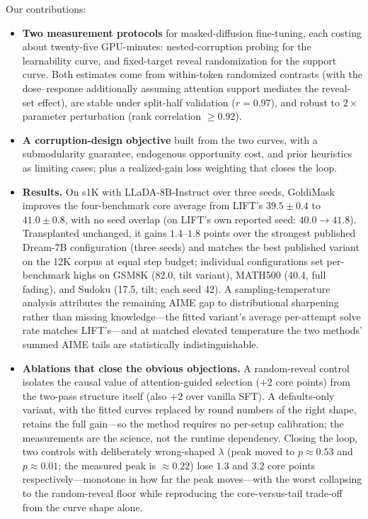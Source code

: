 \documentclass{article} %
\begin{document}
Our contributions:
\begin{itemize}
\item \textbf{Two measurement protocols} for masked-diffusion fine-tuning, each costing about twenty-five GPU-minutes: nested-corruption probing for the learnability curve, and fixed-target reveal randomization for the support curve. Both estimates come from within-token randomized contrasts (with the dose--response additionally assuming attention support mediates the reveal-set effect), are stable under split-half validation ($r = 0.97$), and robust to $2\times$ parameter perturbation (rank correlation $\geq 0.92$).
\item \textbf{A corruption-design objective} built from the two curves, with a submodularity guarantee, endogenous opportunity cost, and prior heuristics as limiting cases; plus a realized-gain loss weighting that closes the loop.
\item \textbf{Results.} On s1K with LLaDA-8B-Instruct over three seeds, GoldiMask improves the four-benchmark core average from LIFT's $39.5 \pm 0.4$ to $41.0 \pm 0.8$, with no seed overlap (on LIFT's own reported seed: $40.0 \to 41.8$). Transplanted unchanged, it gains $1.4$--$1.8$ points over the strongest published Dream-7B configuration (three seeds) and matches the best published variant on the 12K corpus at equal step budget; individual configurations set per-benchmark highs on GSM8K (82.0, tilt variant), MATH500 (40.4, full fading), and Sudoku (17.5, tilt; each seed 42). A sampling-temperature analysis attributes the remaining AIME gap to distributional sharpening rather than missing knowledge---the fitted variant's average per-attempt solve rate matches LIFT's---and at matched elevated temperature the two methods' summed AIME tails are statistically indistinguishable.
\item \textbf{Ablations that close the obvious objections.} A random-reveal control isolates the causal value of attention-guided selection ($+2$ core points) from the two-pass structure itself (also $+2$ over vanilla SFT). A defaults-only variant, with the fitted curves replaced by round numbers of the right shape, retains the full gain---so the method requires no per-setup calibration; the measurements are the science, not the runtime dependency. Closing the loop, two controls with deliberately wrong-shaped $\lambda$ (peak moved to $p \approx 0.53$ and $p \approx 0.01$; the measured peak is $\approx 0.22$) lose $1.3$ and $3.2$ core points respectively---monotone in how far the peak moves---with the worst collapsing to the random-reveal floor while reproducing the core-versus-tail trade-off from the curve shape alone.
\end{itemize}
\end{document}
